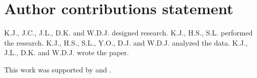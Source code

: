 \section*{Author contributions statement}

K.J., J.C., J.L., D.K. and W.D.J. designed research.
K.J., H.S., S.L. performed the research.
K.J., H.S., S.L., Y.O., D.J. and W.D.J. analyzed the data.
K.J., J.L., D.K. and W.D.J. wrote the paper.

This work was supported by  and .


